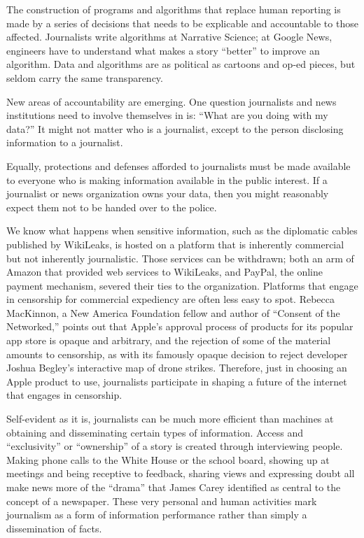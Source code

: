 The construction of programs and algorithms that replace human reporting is
made by a series of decisions that needs to be explicable and accountable to those
affected. Journalists write algorithms at Narrative Science; at Google News, engineers
have to understand what makes a story ``better'' to improve an algorithm.
Data and algorithms are as political as cartoons and op-ed pieces, but seldom
carry the same transparency.

New areas of accountability are emerging. One question journalists and news
institutions need to involve themselves in is: ``What are you doing with my data?''
It might not matter who is a journalist, except to the person disclosing information
to a journalist.

Equally, protections and defenses afforded to journalists must be made available
to everyone who is making information available in the public interest. If a journalist
or news organization owns your data, then you might reasonably expect
them not to be handed over to the police.

We know what happens when sensitive information, such as the diplomatic
cables published by WikiLeaks, is hosted on a platform that is inherently commercial
but not inherently journalistic. Those services can be withdrawn; both an
arm of Amazon that provided web services to WikiLeaks, and PayPal, the online
payment mechanism, severed their ties to the organization. Platforms that engage
in censorship for commercial expediency are often less easy to spot. Rebecca
MacKinnon, a New America Foundation fellow and author of ``Consent of the
Networked,'' points out that Apple’s approval process of products for its popular
app store is opaque and arbitrary, and the rejection of some of the material
amounts to censorship, as with its famously opaque decision to reject developer
Joshua Begley’s interactive map of drone strikes. Therefore, just in choosing an
Apple product to use, journalists participate in shaping a future of the internet
that engages in censorship.

Self-evident as it is, journalists can be much more efficient than machines at
obtaining and disseminating certain types of information. Access and ``exclusivity''
or ``ownership'' of a story is created through interviewing people. Making
phone calls to the White House or the school board, showing up at meetings and
being receptive to feedback, sharing views and expressing doubt all make news
more of the ``drama'' that James Carey identified as central to the concept of a
newspaper. These very personal and human activities mark journalism as a form
of information performance rather than simply a dissemination of facts.

